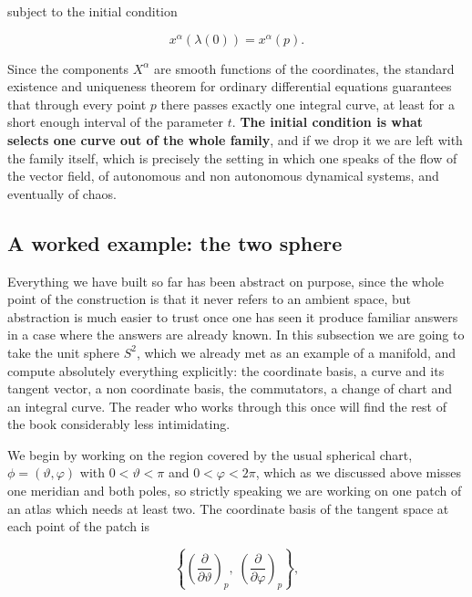         subject to the initial condition

        \begin{equation}
            x^{\alpha}(\lambda(0)) = x^{\alpha}(p).
        \end{equation}

        Since the components $X^{\alpha}$ are smooth functions of the coordinates, the standard existence and uniqueness theorem for ordinary differential equations guarantees that through every point $p$ there passes exactly one integral curve, at least for a short enough interval of the parameter $t$. \textbf{The initial condition is what selects one curve out of the whole family}, and if we drop it we are left with the family itself, which is precisely the setting in which one speaks of the flow of the vector field, of autonomous and non autonomous dynamical systems, and eventually of chaos.

    \subsection{A worked example: the two sphere}

        Everything we have built so far has been abstract on purpose, since the whole point of the construction is that it never refers to an ambient space, but abstraction is much easier to trust once one has seen it produce familiar answers in a case where the answers are already known. In this subsection we are going to take the unit sphere $S^2$, which we already met as an example of a manifold, and compute absolutely everything explicitly: the coordinate basis, a curve and its tangent vector, a non coordinate basis, the commutators, a change of chart and an integral curve. The reader who works through this once will find the rest of the book considerably less intimidating.

        We begin by working on the region covered by the usual spherical chart, $\phi = (\vartheta,\varphi)$ with $0 < \vartheta < \pi$ and $0 < \varphi < 2\pi$, which as we discussed above misses one meridian and both poles, so strictly speaking we are working on one patch of an atlas which needs at least two. The coordinate basis of the tangent space at each point of the patch is

        \begin{equation}
            \left\{\left(\frac{\partial}{\partial \vartheta}\right)_p,\;\left(\frac{\partial}{\partial \varphi}\right)_p\right\},
        \end{equation}

